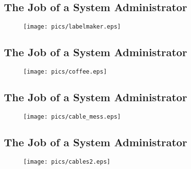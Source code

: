 \documentclass[xga]{xdvislides}
\begin{document}
\subsection{The Job of a System Administrator}
\vspace*{\fill}
\begin{figure}[hb]
	\begin{center}
		\texttt{[image: pics/labelmaker.eps]} \\
	\end{center}
\end{figure}
\vspace*{\fill}

\subsection{The Job of a System Administrator}
\vspace*{\fill}
\begin{figure}[hb]
	\begin{center}
		\texttt{[image: pics/coffee.eps]} \\
	\end{center}
\end{figure}
\vspace*{\fill}

\subsection{The Job of a System Administrator}
\vspace*{\fill}
\begin{figure}[hb]
	\begin{center}
		\texttt{[image: pics/cable\_mess.eps]} \\
	\end{center}
\end{figure}
\vspace*{\fill}

\subsection{The Job of a System Administrator}
\vspace*{\fill}
\begin{figure}[hb]
	\begin{center}
		\texttt{[image: pics/cables2.eps]} \\
	\end{center}
\end{figure}
\vspace*{\fill}
\end{document}
